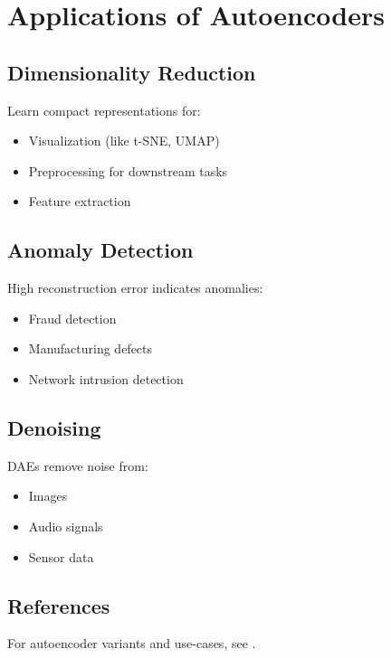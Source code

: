
\section{Applications of Autoencoders}
\label{sec:ae-applications}

\subsection{Dimensionality Reduction}

Learn compact representations for:
\begin{itemize}
    \item Visualization (like t-SNE, UMAP)
    \item Preprocessing for downstream tasks
    \item Feature extraction
\end{itemize}

\subsection{Anomaly Detection}

High reconstruction error indicates anomalies:
\begin{itemize}
    \item Fraud detection
    \item Manufacturing defects
    \item Network intrusion detection
\end{itemize}

\subsection{Denoising}

DAEs remove noise from:
\begin{itemize}
    \item Images
    \item Audio signals
    \item Sensor data
\end{itemize}




\subsection{References}

For autoencoder variants and use-cases, see \textcite{GoodfellowEtAl2016,Prince2023}.
